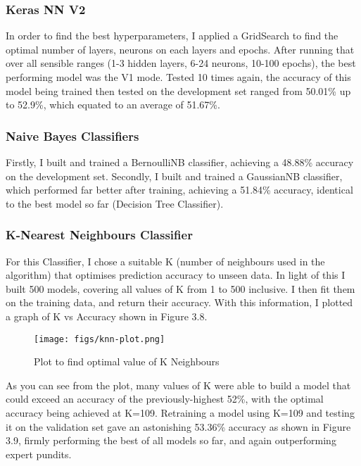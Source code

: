 \documentclass[12pt,a4paper,twoside,openright]{report}
\begin{document}
\subsubsection{Keras NN V2}

In order to find the best hyperparameters, I applied a GridSearch to find the optimal number of layers, neurons on each layers and epochs. After running that over all sensible ranges (1-3 hidden layers, 6-24 neurons, 10-100 epochs), the best performing model was the V1 mode. Tested 10 times again, the accuracy of this model being trained then tested on the development set ranged from 50.01\% up to 52.9\%, which equated to an average of 51.67\%.

\subsubsection{Naive Bayes Classifiers}

 Firstly, I built and trained a BernoulliNB classifier, achieving a 48.88\% accuracy on the development set. Secondly, I built and trained a GaussianNB classifier, which performed far better after training, achieving a 51.84\% accuracy, identical to the best model so far (Decision Tree Classifier).

\subsubsection{K-Nearest Neighbours Classifier}

For this Classifier, I chose a suitable K (number of neighbours used in the algorithm) that optimises prediction accuracy to unseen data. In light of this I built 500 models, covering all values of K from 1 to 500 inclusive. I then fit them on the training data, and return their accuracy. With this information, I plotted a graph of K vs Accuracy shown in Figure 3.8. 

\begin{figure}[h]
  \centering
  \texttt{[image: figs/knn-plot.png]}
  \caption{Plot to find optimal value of K Neighbours}
  \label{fig:knn-plot}
\end{figure}

As you can see from the plot, many values of K were able to build a model that could exceed an accuracy of the previously-highest 52\%, with the optimal accuracy being achieved at K=109. Retraining a model using K=109 and testing it on the validation set gave an astonishing 53.36\% accuracy as shown in Figure 3.9, firmly performing the best of all models so far, and again outperforming expert pundits.
\end{document}
